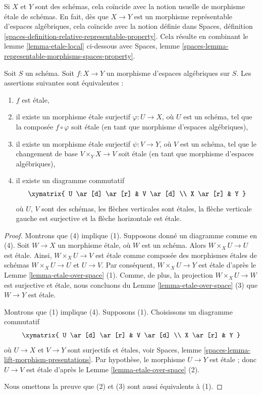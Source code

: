 \noindent
Si $X$ et $Y$ sont des schémas, cela coïncide avec la notion usuelle de
morphisme \'etale de schémas. En fait, dès que $X \to Y$ est un morphisme
représentable d'espaces algébriques, cela coïncide avec la notion définie dans
Spaces, définition \ref{spaces-definition-relative-representable-property}.
Cela résulte en combinant le lemme \ref{lemma-etale-local} ci-dessous avec
Spaces, lemme \ref{spaces-lemma-representable-morphisms-spaces-property}.

\begin{lemma}
\label{lemma-etale-local}
Soit $S$ un schéma.
Soit $f : X \to Y$ un morphisme d'espaces algébriques sur $S$.
Les assertions suivantes sont équivalentes :
\begin{enumerate}
\item $f$ est \'etale,
\item il existe un morphisme \'etale surjectif $\varphi : U \to X$,
où $U$ est un schéma, tel que la composée $f \circ \varphi$ soit
\'etale (en tant que morphisme d'espaces algébriques),
\item il existe un morphisme \'etale surjectif $\psi : V \to Y$,
où $V$ est un schéma, tel que le changement de base $V \times_Y X \to V$
soit \'etale (en tant que morphisme d'espaces algébriques),
\item il existe un diagramme commutatif
$$
\xymatrix{
U \ar[d] \ar[r] & V \ar[d] \\
X \ar[r] & Y
}
$$
où $U$, $V$ sont des schémas, les flèches verticales sont \'etales, la
flèche verticale gauche est surjective et la flèche horizontale est \'etale.
\end{enumerate}
\end{lemma}

\begin{proof}
Montrons que (4) implique (1). Supposons donné un diagramme comme en (4).
Soit $W \to X$ un morphisme \'etale, où $W$ est un schéma. Alors
$W \times_X U \to U$ est \'etale. Ainsi, $W \times_X U \to V$ est \'etale
comme composée des morphismes \'etales de schémas $W \times_X U \to U$
et $U \to V$. Par conséquent, $W \times_X U \to Y$ est \'etale d'après le
Lemme \ref{lemma-etale-over-space} (1). Comme, de plus,
la projection $W \times_X U \to W$ est surjective et \'etale, nous concluons
du Lemme \ref{lemma-etale-over-space} (3) que $W \to Y$ est \'etale.

\medskip\noindent
Montrons que (1) implique (4). Supposons (1). Choisissons un diagramme commutatif
$$
\xymatrix{
U \ar[d] \ar[r] & V \ar[d] \\
X \ar[r] & Y
}
$$
où $U \to X$ et $V \to Y$ sont surjectifs et \'etales, voir
Spaces, lemme \ref{spaces-lemma-lift-morphism-presentations}.
Par hypothèse, le morphisme $U \to Y$ est \'etale ;
donc $U \to V$ est \'etale d'après le Lemme \ref{lemma-etale-over-space} (2).

\medskip\noindent
Nous omettons la preuve que (2) et (3) sont aussi équivalents à (1).
\end{proof}

